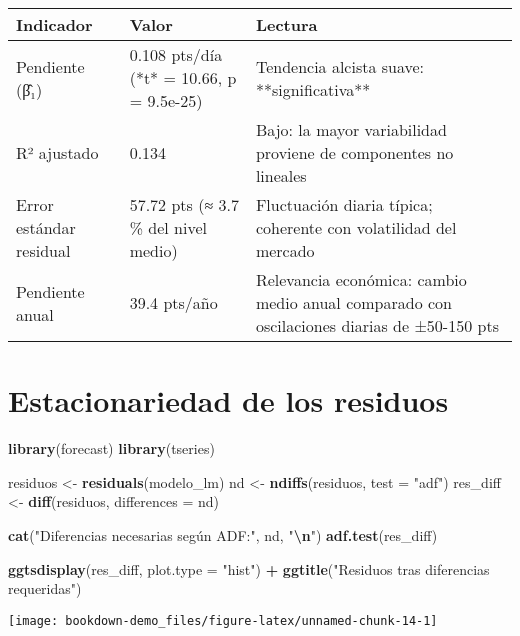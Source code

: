 \documentclass[
  11pt,
]{book}
\newenvironment{Shaded}{\begin{snugshade}}{\end{snugshade}}
\newcommand{\AttributeTok}[1]{\textcolor[rgb]{0.13,0.29,0.53}{#1}}
\newcommand{\FunctionTok}[1]{\textcolor[rgb]{0.13,0.29,0.53}{\textbf{#1}}}
\newcommand{\NormalTok}[1]{#1}
\newcommand{\OtherTok}[1]{\textcolor[rgb]{0.56,0.35,0.01}{#1}}
\newcommand{\SpecialCharTok}[1]{\textcolor[rgb]{0.81,0.36,0.00}{\textbf{#1}}}
\newcommand{\StringTok}[1]{\textcolor[rgb]{0.31,0.60,0.02}{#1}}
\begin{document}
\begin{tabular}{l|l|l}
\hline
Indicador & Valor & Lectura\\
\hline
Pendiente (β̂₁) & 0.108 pts/día
(*t* = 10.66, p = 9.5e-25) & Tendencia alcista suave: **significativa**\\
\hline
R² ajustado & 0.134 & Bajo: la mayor variabilidad proviene de componentes no lineales\\
\hline
Error estándar residual & 57.72 pts (≈ 3.7 \% del nivel medio) & Fluctuación diaria típica; coherente con volatilidad del mercado\\
\hline
Pendiente anual & 39.4 pts/año & Relevancia económica: cambio medio anual comparado con oscilaciones diarias de ±50-150 pts\\
\hline
\end{tabular}

\section{Estacionariedad de los residuos}\label{estacionariedad-de-los-residuos}

\begin{Shaded}
\begin{Highlighting}[]
\FunctionTok{library}\NormalTok{(forecast)}
\FunctionTok{library}\NormalTok{(tseries)}

\NormalTok{residuos }\OtherTok{\textless{}{-}} \FunctionTok{residuals}\NormalTok{(modelo\_lm)}
\NormalTok{nd       }\OtherTok{\textless{}{-}} \FunctionTok{ndiffs}\NormalTok{(residuos, }\AttributeTok{test =} \StringTok{"adf"}\NormalTok{)}
\NormalTok{res\_diff }\OtherTok{\textless{}{-}} \FunctionTok{diff}\NormalTok{(residuos, }\AttributeTok{differences =}\NormalTok{ nd)}

\FunctionTok{cat}\NormalTok{(}\StringTok{"Diferencias necesarias según ADF:"}\NormalTok{, nd, }\StringTok{"}\SpecialCharTok{\textbackslash{}n}\StringTok{"}\NormalTok{)}
\FunctionTok{adf.test}\NormalTok{(res\_diff)}

\FunctionTok{ggtsdisplay}\NormalTok{(res\_diff, }\AttributeTok{plot.type =} \StringTok{"hist"}\NormalTok{) }\SpecialCharTok{+}
  \FunctionTok{ggtitle}\NormalTok{(}\StringTok{"Residuos tras diferencias requeridas"}\NormalTok{)}
\end{Highlighting}
\end{Shaded}

\begin{center}\texttt{[image: bookdown-demo\_files/figure-latex/unnamed-chunk-14-1]} \end{center}
\end{document}
